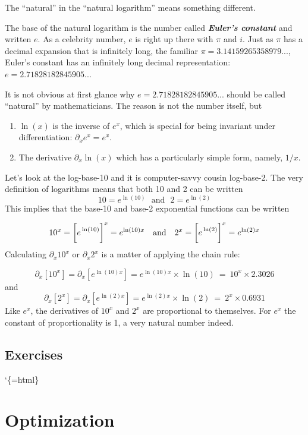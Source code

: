 \documentclass[
  letterpaper,
  DIV=11,
  numbers=noendperiod,
  oneside]{scrreprt}
\providecommand{\tightlist}{%
  \setlength{\itemsep}{0pt}\setlength{\parskip}{0pt}}
\begin{document}
The ``natural'' in the ``natural logarithm'' means something different.

The base of the natural logarithm is the number called
\textbf{\emph{Euler's constant}} and written \(e\). As a celebrity
number, \(e\) is right up there with \(\pi\) and \(i\). Just as \(\pi\)
has a decimal expansion that is infinitely long, the familiar
\(\pi = 3.14159265358979...\), Euler's constant has an infinitely long
decimal representation: \(e = 2.71828182845905...\)

It is not obvious at first glance why \(e = 2.71828182845905...\) should
be called ``natural'' by mathematicians. The reason is not the number
itself, but

\begin{enumerate}
\def\labelenumi{\arabic{enumi}.}
\tightlist
\item
  \(\ln(x)\) is the inverse of \(e^x\), which is special for being
  invariant under differentiation: \(\partial_x e^x = e^x\).
\item
  The derivative \(\partial_x \ln(x)\) which has a particularly simple
  form, namely, \(1/x\).
\end{enumerate}

Let's look at the log-base-10 and it is computer-savvy cousin
log-base-2. The very definition of logarithms means that both 10 and 2
can be written \[10 = e^{\ln(10)}\ \ \ \text{and}\ \ \ 2 = e^{\ln(2)}\]
This implies that the base-10 and base-2 exponential functions can be
written

\[10^x = \left[\strut e^{\strut\ln(10)}\right]^x = e^{\ln(10)x} \ \ \ \text{and}\ \ \ 2^x = \left[\strut e^{\strut\ln(2)}\right]^x = e^{\ln(2) x}\]
Calculating \(\partial_x 10^x\) or \(\partial_x 2^x\) is a matter of
applying the chain rule:

\[\partial_x [10^x] = \partial_x [e^{\ln(10)x}] = e^{\ln(10)x} \times \ln(10) \ =\  10^x \times 2.3026\]
and
\[\partial_x [2^x] = \partial_x [e^{\ln(2)x}] = e^{\ln(2)x} \times \ln(2) \ = \ 2^x \times 0.6931\]
Like \(e^x\), the derivatives of \(10^x\) and \(2^x\) are proportional
to themselves. For \(e^x\) the constant of proportionality is 1, a very
natural number indeed.

\hypertarget{exercises-6}{%
\section{Exercises}\label{exercises-6}}

`\{=html\}

\hypertarget{sec-optim-and-shape}{%
\chapter{Optimization}\label{sec-optim-and-shape}}
\end{document}
